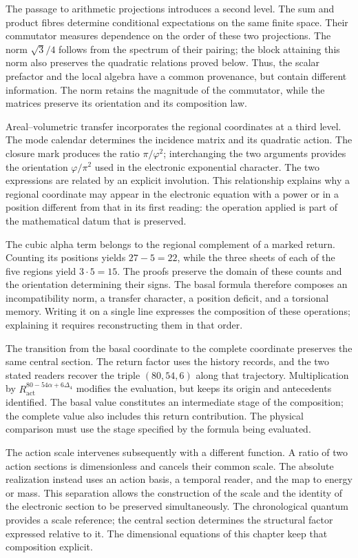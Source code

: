 The passage to arithmetic projections introduces a second level. The
sum and product fibres determine conditional expectations on the
same finite space. Their commutator measures dependence on the
order of these two projections. The norm $\sqrt3/4$ follows from the spectrum
of their pairing; the block attaining this norm also preserves
the quadratic relations proved below. Thus, the scalar
prefactor and the local algebra have a common provenance, but
contain different information. The norm retains the magnitude of the
commutator, while the matrices preserve its orientation and its
composition law.

Areal--volumetric transfer incorporates the regional coordinates
at a third level. The mode calendar determines the incidence
matrix and its quadratic action. The closure mark produces the ratio
$\pi/\varphi^2$; interchanging the two arguments provides the
orientation $\varphi/\pi^2$ used in the electronic exponential
character. The two expressions are related by an explicit
involution. This relationship explains why a regional coordinate may
appear in the electronic equation with a power or in a position
different from that in its first reading: the operation applied
is part of the mathematical datum that is preserved.

The cubic alpha term belongs to the regional complement of a marked
return. Counting its positions yields $27-5=22$, while the
three sheets of each of the five regions yield $3\cdot5=15$.
The proofs preserve the domain of these counts and the
orientation determining their signs. The basal formula therefore
composes an incompatibility norm, a transfer character,
a position deficit, and a torsional memory.
Writing it on a single line expresses the composition of these
operations; explaining it requires reconstructing them in that order.

The transition from the basal coordinate to the complete coordinate preserves
the same central section. The return factor uses the history
records, and the two stated readers recover the triple
$(80,54,6)$ along that trajectory. Multiplication by
$R_{\mathrm{act}}^{80-54\alpha+6\Delta_4}$ modifies the evaluation,
but keeps its origin and antecedents identified. The basal
value constitutes an intermediate stage of the composition; the complete
value also includes this return contribution. The physical
comparison must use the stage specified by the formula being evaluated.

The action scale intervenes subsequently with a different function. A ratio of
two action sections is dimensionless and cancels their common scale.
The absolute realization instead uses an action basis, a
temporal reader, and the map to energy or mass. This separation allows
the construction of the scale and the identity of the electronic section
to be preserved simultaneously. The chronological quantum provides a
scale reference; the central section determines the structural factor
expressed relative to it. The dimensional equations of this
chapter keep that composition explicit.

